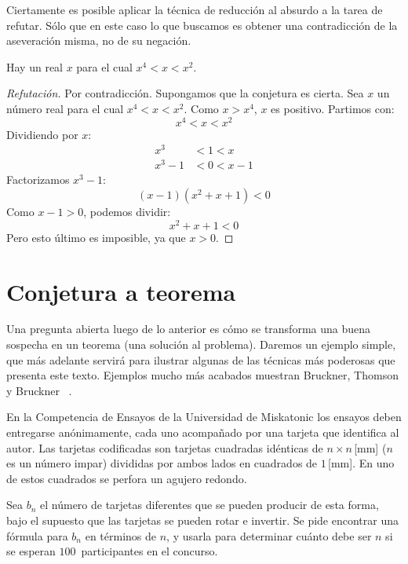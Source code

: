   Ciertamente es posible aplicar la técnica de reducción al absurdo
  a la tarea de refutar.
  Sólo que en este caso lo que buscamos es obtener una contradicción
  de la aseveración misma,
  no de su negación.
  \begin{conjecture}
    Hay un real \(x\) para el cual \(x^4 < x < x^2\).
  \end{conjecture}
  \begin{proof}[Refutación]
    Por contradicción.%
    Supongamos que la conjetura es cierta.
    Sea \(x\) un número real para el cual \(x^4 < x < x^2\).
    Como \(x > x^4\),
    \(x\) es positivo.
    Partimos con:
    \begin{equation*}
      x^4 < x < x^2
    \end{equation*}
    Dividiendo por \(x\):
    \begin{align*}
      x^3     &< 1 < x \\
      x^3 - 1 &< 0 < x - 1
    \end{align*}
    Factorizamos \(x^3 - 1\):
    \begin{equation*}
      (x - 1) (x^2 + x + 1)
	< 0
    \end{equation*}
    Como \(x - 1 > 0\), podemos dividir:
    \begin{equation*}
      x^2 + x + 1
	< 0
    \end{equation*}
    Pero esto último es imposible,
    ya que \(x > 0\).
  \end{proof}

\section{Conjetura a teorema}
\label{sec:conjetura->teorema}

  Una pregunta abierta luego de lo anterior
  es cómo se transforma una buena sospecha en un teorema
  (una solución al problema).
  Daremos un ejemplo simple,
  que más adelante servirá
  para ilustrar algunas de las técnicas más poderosas
  que presenta este texto.
  Ejemplos mucho más acabados
  muestran Bruckner, Thomson y Bruckner~%
    \cite{bruckner11:_mathem_discovery}.

  \begin{example}
    En la Competencia de Ensayos de la Universidad de Miskatonic
    los ensayos deben entregarse anónimamente,
    cada uno acompañado por una tarjeta que identifica al autor.
    Las tarjetas codificadas son tarjetas cuadradas idénticas
    de \(n \times n\)\,[mm]
    (\(n\) es un número impar)
    divididas por ambos lados en cuadrados de \(1\)\,[mm].
    En uno de estos cuadrados se perfora un agujero redondo.

    Sea \(b_n\) el número de tarjetas diferentes
    que se pueden producir de esta forma,
    bajo el supuesto que las tarjetas se pueden rotar e invertir.
    Se pide encontrar una fórmula para \(b_n\) en términos de \(n\),
    y usarla para determinar cuánto debe ser \(n\)
    si se esperan \(100\)~participantes en el concurso.
  \end{example}

